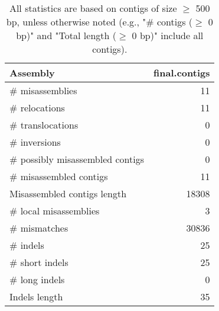 \documentclass[12pt,a4paper]{article}
\begin{document}
\begin{table}[ht]
\begin{center}
\caption{All statistics are based on contigs of size $\geq$ 500 bp, unless otherwise noted (e.g., "\# contigs ($\geq$ 0 bp)" and "Total length ($\geq$ 0 bp)" include all contigs).}
\begin{tabular}{|l*{1}{|r}|}
\hline
Assembly & final.contigs \\ \hline
\# misassemblies & 11 \\ \hline
\hspace{5mm}\# relocations & 11 \\ \hline
\hspace{5mm}\# translocations & 0 \\ \hline
\hspace{5mm}\# inversions & 0 \\ \hline
\# possibly misassembled contigs & 0 \\ \hline
\# misassembled contigs & 11 \\ \hline
Misassembled contigs length & 18308 \\ \hline
\# local misassemblies & 3 \\ \hline
\# mismatches & 30836 \\ \hline
\# indels & 25 \\ \hline
\hspace{5mm}\# short indels & 25 \\ \hline
\hspace{5mm}\# long indels & 0 \\ \hline
Indels length & 35 \\ \hline
\end{tabular}
\end{center}
\end{table}
\end{document}
